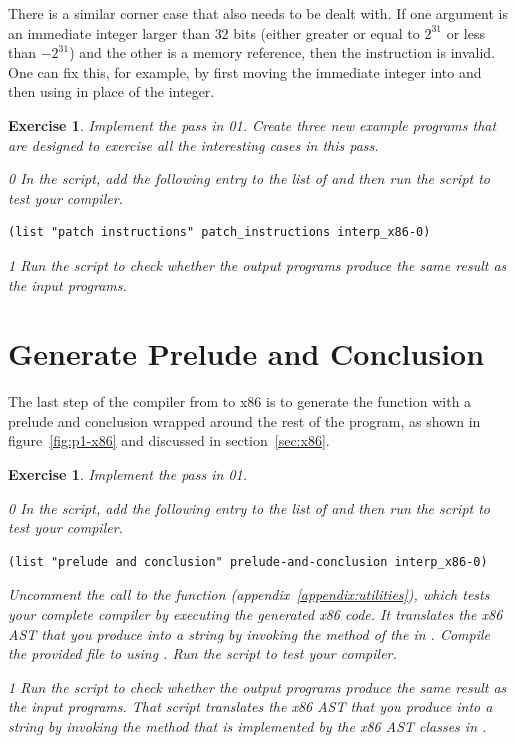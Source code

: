 \documentclass[7x10]{TimesAPriori_MIT}%
\def\racketEd{0}
\def\pythonEd{1}
\def\edition{1}
\newcommand{\racket}[1]{{\if\edition\racketEd{#1}\fi}}
\newcommand{\pythonColor}[0]{}
\newcommand{\python}[1]{{\if\edition\pythonEd\pythonColor #1\fi}}
\newtheorem{exercise}[theorem]{Exercise}
\numberwithin{theorem}{chapter}
\numberwithin{definition}{chapter}
\numberwithin{equation}{chapter}
\begin{document}
There is a similar corner case that also needs to be dealt with. If
one argument is an immediate integer larger than $32$ bits (either
greater or equal to $2^{31}$ or less than $-2^{31}$) and the
other is a memory reference, then the instruction is invalid.  One can
fix this, for example, by first moving the immediate integer into
 and then using  in place of the integer.

\begin{exercise}
\normalfont\normalsize Implement the  pass in
\racket{}\python{}.
Create three new example programs that are
designed to exercise all the interesting cases in this pass.
%
{\if\edition\racketEd
In the  script, add the following entry to the
list of  and then run the script to test your compiler.
\begin{lstlisting}
(list "patch instructions" patch_instructions interp_x86-0)
\end{lstlisting}
\fi}
{\if\edition\pythonEd\pythonColor
Run the  script to check
whether the output programs produce the same result as the input
programs.
\fi}
\end{exercise}


\section{Generate Prelude and Conclusion}
\label{sec:print-x86}

The last step of the compiler from \LangVar{} to x86 is to generate
the  function with a prelude and conclusion wrapped around
the rest of the program, as shown in figure~\ref{fig:p1-x86} and
discussed in section~\ref{sec:x86}.

\begin{exercise}\normalfont\normalsize
%
Implement the  pass in
\racket{}\python{}.
%
{\if\edition\racketEd
In the  script, add the following entry to the
list of  and then run the script to test your compiler.
\begin{lstlisting}
(list "prelude and conclusion" prelude-and-conclusion interp_x86-0)
\end{lstlisting}
%  
Uncomment the call to the  function
(appendix~\ref{appendix:utilities}), which tests your complete
compiler by executing the generated x86 code. It translates the x86
AST that you produce into a string by invoking the 
method of the  in . Compile
the provided  file to  using
. Run the script to test your compiler.
%
\fi}
{\if\edition\pythonEd\pythonColor
%
Run the  script to check whether the output
programs produce the same result as the input programs. That script
translates the x86 AST that you produce into a string by invoking the
 method that is implemented by the x86 AST classes in
.
%
\fi}

\end{exercise}
\end{document}
